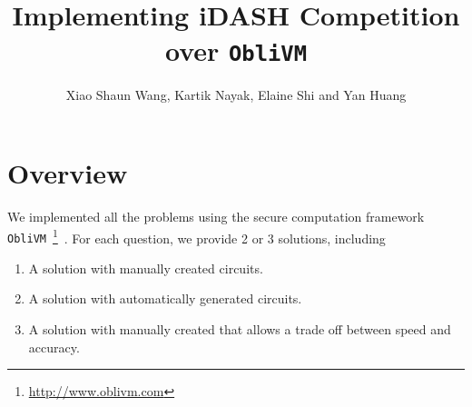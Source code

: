 \documentclass{article}
\title{Implementing iDASH Competition over {\tt ObliVM}}
\author{Xiao Shaun Wang, Kartik Nayak, Elaine Shi and Yan Huang}
\begin{document}
\maketitle
\section{Overview}
We implemented all the problems using the secure computation framework {\tt ObliVM}~\footnote{\url{http://www.oblivm.com}}~\cite{oblivm}.
For each question, we provide 2 or 3 solutions, including
\begin{enumerate}
\item A solution with manually created circuits.
\item A solution with automatically generated circuits.
\item A solution with manually created that allows a trade off between speed and accuracy.
\end{enumerate}


%


\end{document}
